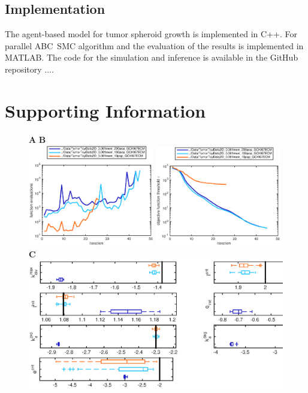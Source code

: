 \documentclass[10pt,letterpaper]{article}
\begin{document}
\subsection*{Implementation}
The agent-based model for tumor spheroid growth is implemented in C++. For parallel ABC~SMC algorithm and the evaluation of the results is implemented in MATLAB. The code for the simulation and inference is available in the GitHub repository {\color{green}...}. 

\section*{Supporting Information}

\begin{figure}[p]
\textbf{A} \hspace{180pt} \textbf{B} \\
\includegraphics[width=0.49\textwidth]{Data/TumorToyData2D_0.001merr_XXX0pop_GCKI67ECMfunctionEvaluations}
\includegraphics[width=0.49\textwidth]{Data/TumorToyData2D_0.001merr_XXX0pop_GCKI67ECMobjectiveFunction}\\
 \textbf{C} \\
\includegraphics[width=\textwidth]{Data/TumorToyData2D_0.001merr_XXX0pop_GCKI67ECMindependentBoxplots}\\

\end{figure}
\end{document}
